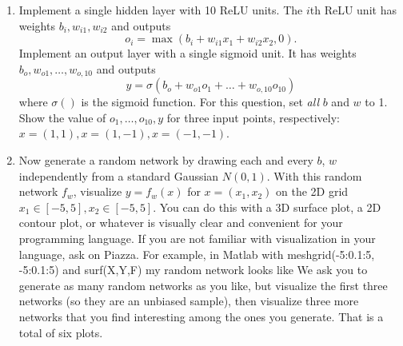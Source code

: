 \documentclass[a4paper]{article}
\theoremstyle{definition}
\begin{document}
\begin{enumerate}
\item Implement a single hidden layer with 10 ReLU units.
The $i$th ReLU unit has weights $b_i, w_{i1}, w_{i2}$ and outputs 
$$o_i =\max( b_i + w_{i1} x_1 + w_{i2} x_2, 0).$$
Implement an output layer with a single sigmoid unit.
It has weights $b_o, w_{o1}, \ldots, w_{o,10}$ and outputs
$$y =\sigma( b_o + w_{o1} o_1 + \ldots + w_{o,10} o_{10})$$
where $\sigma()$ is the sigmoid function.
For this question, set \emph{all} $b$ and $w$ to 1.
Show the value of $o_1, \ldots, o_{10}, y$ for three input points, respectively: $x=(1,1), x=(1, -1), x=(-1,-1)$.

\item Now generate a random network by drawing each and every $b$, $w$ independently from a standard Gaussian $N(0,1)$.
With this random network $f_w$, visualize $y=f_w(x)$ for $x=(x_1,x_2)$ on the 2D grid $x_1 \in [-5,5], x_2 \in [-5, 5]$.
You can do this with a 3D surface plot, a 2D contour plot, or whatever is visually clear and convenient for your programming language.
If you are not familiar with visualization in your language, ask on Piazza.
For example, in Matlab with meshgrid(-5:0.1:5, -5:0.1:5) and surf(X,Y,F) my random network looks like
We ask you to generate as many random networks as you like, but visualize the first three networks (so they are an unbiased sample), then visualize three more networks that you find interesting among the ones you generate.
That is a total of six plots.


\end{enumerate}
\end{document}
